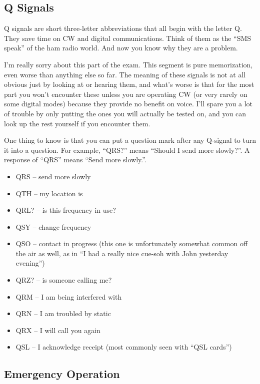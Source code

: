 \documentclass[letterpaper,12pt]{scrartcl}
\begin{document}
\subsection{Q Signals}

Q signals are short three-letter abbreviations that all begin with the letter Q. They save time on CW and digital communications.
Think of them as the ``SMS speak'' of the ham radio world. And now you know why they are a problem.

I'm really sorry about this part of the exam. This segment is pure memorization, even worse than anything else so far.
The meaning of these signals is not at all obvious just by looking at or hearing them, and what's worse is that for the most part
you won't encounter these unless you are operating CW (or very rarely on some digital modes)
because they provide no benefit on voice. I'll spare you a lot of trouble by only putting the ones you will actually be tested on,
and you can look up the rest yourself if you encounter them.

One thing to know is that you can put a question mark after any Q-signal to turn it into a question.
For example, ``QRS?'' means ``Should I send more slowly?''. A response of ``QRS'' means ``Send more slowly.''.

\begin{itemize}
\item QRS -- send more slowly
\item QTH -- my location is
\item QRL? -- is this frequency in use?
\item QSY -- change frequency
\item QSO -- contact in progress (this one is unfortunately somewhat common off the air as well, as in
``I had a really nice cue-soh with John yesterday evening'')
\item QRZ? -- is someone calling me?
\item QRM -- I am being interfered with
\item QRN -- I am troubled by static
\item QRX -- I will call you again
\item QSL -- I acknowledge receipt (most commonly seen with ``QSL cards'')
\end{itemize}

\subsection{Emergency Operation}
\end{document}
